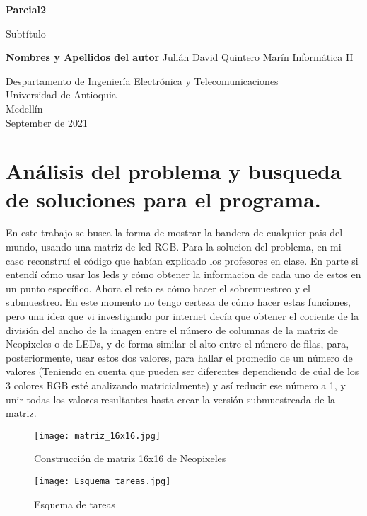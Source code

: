 \documentclass{article}
\begin{document}
\begin{titlepage}
    \begin{center}
        \vspace*{1cm}
            
        \Huge
        \textbf{Parcial2}
            
        \vspace{0.5cm}
        \LARGE
        Subtítulo
            
        \vspace{1.5cm}
            
        \textbf{Nombres y Apellidos del autor}
        \newline Julián David Quintero Marín
        \newline
        \newline
        Informática II
        \vfill
            
        \vspace{0.8cm}
            
        \Large
        Despartamento de Ingeniería Electrónica y Telecomunicaciones\\
        Universidad de Antioquia\\
        Medellín\\
        September de 2021
            
    \end{center}
\end{titlepage}

\tableofcontents
\newpage
\section{Análisis del problema y busqueda de soluciones para el programa.}\label{intro}
En este trabajo se busca la forma de mostrar la bandera de cualquier pais del mundo, usando una matriz de led RGB.
Para la solucion del problema, en mi caso reconstruí el código que habían explicado los profesores en clase. En parte si entendí cómo usar los leds y cómo obtener la informacion de cada uno de estos en un punto específico. Ahora el reto es cómo hacer el sobremuestreo y el submuestreo. En este momento no tengo certeza de cómo hacer estas funciones, pero una idea que vi investigando por internet decía que obtener el cociente de la división del ancho de la imagen entre el número de columnas de la matriz de Neopixeles o de LEDs, y de forma similar el alto entre el número de filas, para, posteriormente, usar estos dos valores, para hallar el promedio de un número de valores (Teniendo en cuenta que pueden ser diferentes dependiendo de cúal de los 3 colores RGB esté analizando matricialmente) y así reducir ese número a 1, y unir todas los valores resultantes hasta crear la versión submuestreada de la matriz.
  \begin{figure}[h]
    \texttt{[image: matriz\_16x16.jpg]}
    \centering
    \caption{Construcción de matriz 16x16 de Neopixeles}
    \label{fig:matriz16x16Neopixeles}
 \end{figure}
 \begin{figure}[h]
  \texttt{[image: Esquema\_tareas.jpg]}
  \centering
  \caption{Esquema de tareas}
  \label{fig:esquema_tareas}
\end{figure}
\end{document}
